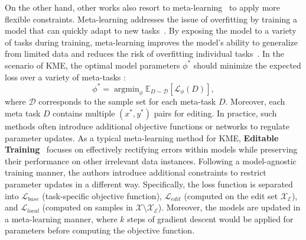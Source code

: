 \documentclass[acmsmall, screen]{acmart}
\DeclareMathOperator*{\argmin}{argmin}
\begin{document}



On the other hand, other works also resort to meta-learning~\cite{finn2017model,vanschoren2018meta} to apply more flexible constraints. 
Meta-learning addresses the issue of overfitting by training a model that can quickly adapt to new tasks~\cite{hospedales2021meta}. By exposing the model to a variety of tasks during training, meta-learning improves the model's ability to generalize from limited data and reduces the risk of overfitting individual tasks~\cite{huisman2021survey}. In the scenario of KME, the optimal model parameters $\phi^*$ should minimize the expected loss over a variety of meta-tasks \cite{ravi2016optimization}:
\begin{equation}
    \phi^* = \argmin_\phi\mathbb{E}_{D\sim\mathcal{D}}[\mathcal{L}_\phi({D})],
\end{equation}
where $\mathcal{D}$ corresponds to the sample set for each meta-task $D$. Moreover, each meta task ${D}$ contains multiple $(x^*, y^*)$ pairs for editing. In practice, such methods often introduce additional objective functions or networks to regulate parameter updates. As a typical meta-learning method for KME, \textbf{Editable Training}~\cite{sinitsin2020editable} focuses on effectively rectifying errors within models while preserving their performance on other irrelevant data instances. Following a model-agnostic training manner, the authors introduce additional constraints to restrict parameter updates in a different way. Specifically, the loss function is separated into $\mathcal{L}_{base}$ (task-specific objective function), $\mathcal{L}_{edit}$ (computed on the edit set $\mathcal{X}_\mathcal{E}$), and $\mathcal{L}_{local}$ (computed on samples in $\mathcal{X}\setminus \mathcal{X}_\mathcal{E}$). Moreover, the models are updated in a meta-learning manner, where $k$ steps of gradient descent would be applied for parameters before computing the objective function. 
\end{document}
